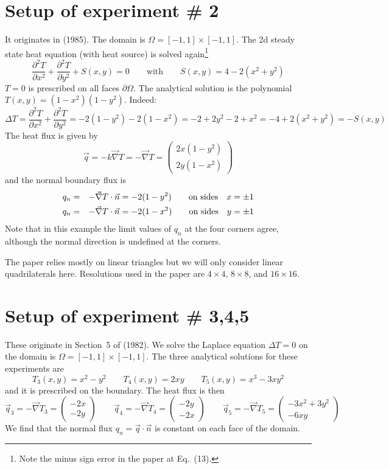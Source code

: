 \section*{Setup of experiment \# 2}

It originates in \textcite{cacs85} (1985). The domain is $\Omega=[-1,1]\times [-1,1]$.
The 2d steady state heat equation (with heat source) is solved again\footnote{Note 
the minus sign error in the paper at Eq.~(13).}
\[
\frac{\partial^2 T}{\partial x^2} + \frac{\partial^2 T}{\partial y^2} + S(x,y) = 0
\qquad \text{with} \qquad
S(x,y)=4-2(x^2+y^2)
\]
$T=0$ is prescribed on all faces $\partial \Omega$.
The analytical solution is the polynomial $T(x,y)=(1-x^2)(1-y^2)$. Indeed:
\[
\Delta T = \frac{\partial^2 T}{\partial x^2} + \frac{\partial^2 T}{\partial y^2}
= -2(1-y^2) -2(1-x^2)
= -2 + 2y^2 -2 + x^2
= -4 + 2(x^2+y^2)
= -S(x,y)
\]
The heat flux is given by 
\[
\vec{q} 
= -k \vec\nabla T 
= -\vec\nabla T 
= 
\left(
\begin{array}{c}
2x(1-y^2) \\
2y(1-x^2)
\end{array}
\right)
\]
and the normal boundary flux is 
\begin{eqnarray}
q_n&=&-\vec\nabla T \cdot \vec{n}=-2(1-y^2) \qquad \text{on sides} \quad x=\pm 1 \nonumber\\
q_n&=&-\vec\nabla T \cdot \vec{n}=-2(1-x^2) \qquad \text{on sides} \quad y=\pm 1 \nonumber
\end{eqnarray}
Note that in this example the limit values of $q_n$ at the four corners agree, 
although the normal direction is undefined at the corners.

The paper relies mostly on linear triangles but we will only consider 
linear quadrilaterals here.
Resolutions used in the paper are $4\times 4$, $8\times 8$, and $16\times 16$.



\newpage
\section*{Setup of experiment \# 3,4,5}

These originate in Section~5 of \textcite{care82} (1982).
We solve the Laplace equation $\Delta T=0$ on the domain is $\Omega=[-1,1]\times [-1,1]$.
The three analytical solutions for these experiments are 
\[
T_3(x,y)=x^2-y^2
\qquad
T_4(x,y)=2xy
\qquad
T_5(x,y)=x^3-3xy^2
\]
and it is prescribed on the boundary. The heat flux is then
\[
\vec{q}_3 
= -\vec\nabla T_3
= \left(\begin{array}{c}
-2x \\ -2y
\end{array}\right)
\qquad
\vec{q}_4
= -\vec\nabla T_4
= \left(\begin{array}{c}
-2y \\ -2x
\end{array}\right)
\qquad
\vec{q}_5
= -\vec\nabla T_5
= \left(\begin{array}{c}
-3x^2+3y^2 \\ -6xy
\end{array}\right)
\]
We find that the normal flux $q_n=\vec{q}\cdot\vec{n}$ is constant on each face 
of the domain.


